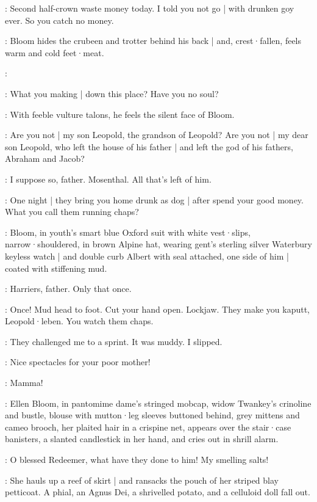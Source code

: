 \Rudolph:
Second half-crown waste money today.
I told you not go |
with drunken goy ever.
So you catch no money.

:
Bloom hides the crubeen and trotter behind his back |
and,
crest·fallen,
feels warm and cold feet·meat.

\Bloom:

\Rudolph:
What you making |
down this place?
Have you no soul?

:
With feeble vulture talons,
he feels the silent face of Bloom.

\Rudolph:
Are you not |
my son Leopold,
the grandson of Leopold?
Are you not |
my dear son Leopold,
who left the house of his father |
and left the god of his fathers,
Abraham and Jacob?

\Bloom:
I suppose so,
father.
Mosenthal.
All that's left of him.

\Rudolph:
One night |
they bring you home drunk as dog |
after spend your good money.
What you call them running chaps?

:
Bloom,
in youth's smart blue Oxford suit with white vest·slips,
narrow·shouldered,
in brown Alpine hat,
wearing gent's sterling silver Waterbury keyless watch |
and double curb Albert with seal attached,
one side of him |
coated with stiffening mud.

\Bloom:
Harriers,
father.
Only that once.

\Rudolph:
Once!
Mud head to foot.
Cut your hand open.
Lockjaw.
They make you kaputt,
Leopold·leben.
You watch them chaps.

\Bloom:
They challenged me to a sprint.
It was muddy.
I slipped.

\Rudolph:
Nice spectacles for your poor mother!

\Bloom:
Mamma!

:
Ellen Bloom,
in pantomime dame's stringed mobcap,
widow Twankey's crinoline and bustle,
blouse with mutton·leg sleeves buttoned behind,
grey mittens and cameo brooch,
her plaited hair in a crispine net,
appears over the stair·case banisters,
a slanted candlestick in her hand,
and cries out in shrill alarm.

\Ellen:
O blessed Redeemer,
what have they done to him!
My smelling salts!

:
She hauls up a reef of skirt |
and ransacks the pouch of her striped blay petticoat.
A phial,
an Agnus Dei,
a shrivelled potato,
and a celluloid doll fall out.

